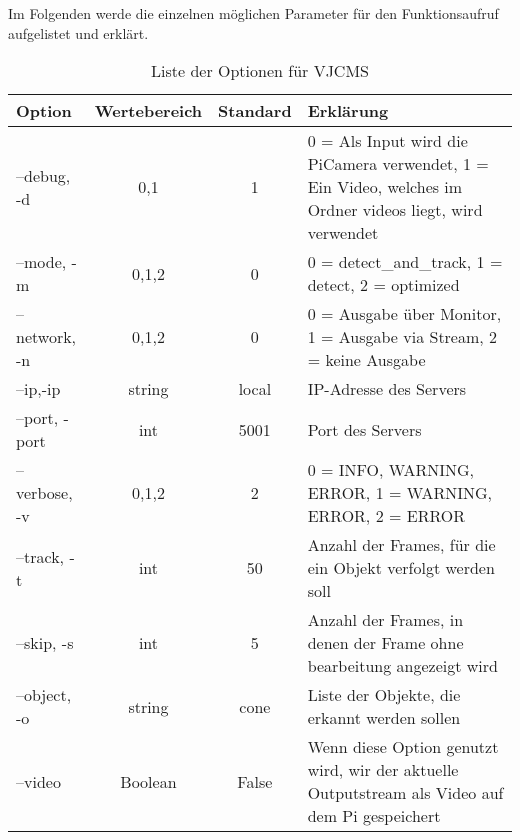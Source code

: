 Im Folgenden werde die einzelnen möglichen Parameter für den Funktionsaufruf aufgelistet und erklärt.
\begin{table}[H]
\begin{tabular}{|l|c|c|p{8cm}|}
\hline
Option& Wertebereich&Standard&Erklärung\\
\hline
--debug, -d & {0,1} & 1 & 0 = Als Input wird die PiCamera verwendet, 1 = Ein Video, welches im Ordner videos liegt, wird verwendet\\
\hline
--mode, -m & 0,1,2 & 0 & 0 = detect\_and\_track, 1 = detect, 2 = optimized \\
\hline 
--network, -n & 0,1,2 & 0 & 0 = Ausgabe über Monitor, 1 = Ausgabe via Stream, 2 = keine Ausgabe\\
\hline
--ip,-ip & string & local & IP-Adresse des Servers\\
\hline
--port, -port & int & 5001 & Port des Servers\\
\hline
--verbose, -v & 0,1,2 & 2 &0 = INFO, WARNING, ERROR, 1 = WARNING, ERROR, 2 = ERROR\\
\hline
--track, -t & int & 50 & Anzahl der Frames, für die ein Objekt verfolgt werden soll\\
\hline
--skip, -s & int & 5 & Anzahl der Frames, in denen der Frame ohne bearbeitung angezeigt wird\\
\hline
--object, -o & string & cone & Liste der Objekte, die erkannt werden sollen\\
\hline
--video & Boolean & False & Wenn diese Option genutzt wird, wir der aktuelle Outputstream als Video auf dem Pi gespeichert\\
\hline
\end{tabular}
\caption{Liste der Optionen für VJCMS}
\label{options}
\end{table}

